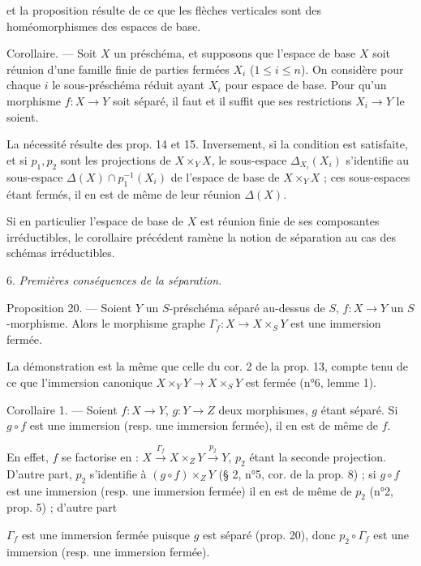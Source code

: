 \newpage


et la proposition résulte de ce que les flèches verticales sont des homéomorphismes des espaces de base.

Corollaire. — Soit $X$ un préschéma, et supposons que l'espace de base $X$ soit réunion d'une famille finie de parties fermées $X_i$ ($1 \le i \le n$). On considère pour chaque $i$ le sous-préschéma réduit ayant $X_i$ pour espace de base. Pour qu'un morphisme $f : X \to Y$ soit séparé, il faut et il suffit que ses restrictions $X_i \to Y$ le soient.

La nécessité résulte des prop. 14 et 15. Inversement, si la condition est satisfaite, et si $p_1, p_2$ sont les projections de $X \times_Y X$, le sous-espace $\Delta_{X_i}(X_i)$ s'identifie au sous-espace $\Delta(X) \cap p_1^{-1}(X_i)$ de l'espace de base de $X \times_Y X$ ; ces sous-espaces étant fermés, il en est de même de leur réunion $\Delta(X)$.

Si en particulier l'espace de base de $X$ est réunion finie de ses composantes irréductibles, le corollaire précédent ramène la notion de séparation au cas des schémas irréductibles.

6. \emph{Premières conséquences de la séparation.}

Proposition 20. — Soient $Y$ un $S$-préschéma séparé au-dessus de $S$, $f : X \to Y$ un $S$-morphisme. Alors le morphisme graphe $\Gamma_f : X \to X \times_S Y$ est une immersion fermée.

La démonstration est la même que celle du cor. 2 de la prop. 13, compte tenu de ce que l'immersion canonique $X \times_Y Y \to X \times_S Y$ est fermée (n°6, lemme 1).

Corollaire 1. — Soient $f : X \to Y$, $g : Y \to Z$ deux morphismes, $g$ étant séparé. Si $g \circ f$ est une immersion (resp. une immersion fermée), il en est de même de $f$.

En effet, $f$ se factorise en : $X \xrightarrow{\Gamma_f} X \times_Z Y \xrightarrow{p_2} Y$, $p_2$ étant la seconde projection. D'autre part, $p_2$ s'identifie à $(g \circ f) \times_Z Y$ (§ 2, n°5, cor. de la prop. 8) ; si $g \circ f$ est une immersion (resp. une immersion fermée) il en est de même de $p_2$ (n°2, prop. 5) ; d'autre part

\newpage


$\Gamma_f$ est une immersion fermée puisque $g$ est séparé (prop. 20), donc $p_2 \circ \Gamma_f$ est une immersion (resp. une immersion fermée).

